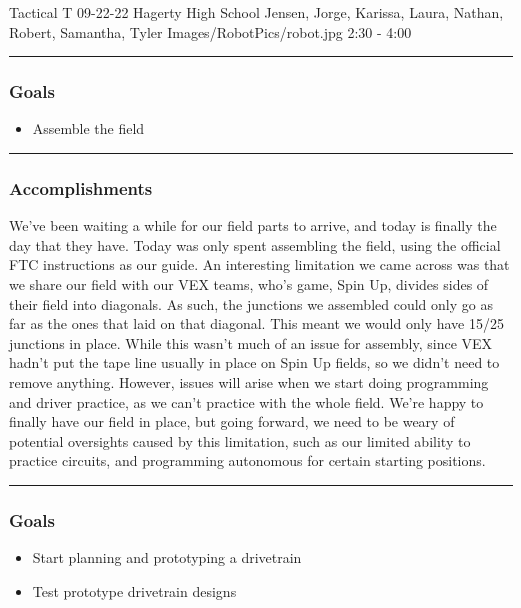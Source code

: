 \insertmeeting 
	{Tactical T} 
	{09-22-22}
	{Hagerty High School}
	{Jensen, Jorge, Karissa, Laura, Nathan, Robert, Samantha, Tyler}
	{Images/RobotPics/robot.jpg}
	{2:30 - 4:00}
	
\noindent\hfil\rule{\textwidth}{.4pt}\hfil
\subsubsection*{Goals}
\begin{itemize}
    \item Assemble the field

\end{itemize} 

\noindent\hfil\rule{\textwidth}{.4pt}\hfil

\subsubsection*{Accomplishments}
We've been waiting a while for our field parts to arrive, and today is finally the day that they have. Today was only spent assembling the field, using the official FTC instructions as our guide. An interesting limitation we came across was that we share our field with our VEX teams, who's game, Spin Up, divides sides of their field into diagonals. As such, the junctions we assembled could only go as far as the ones that laid on that diagonal. This meant we would only have 15/25 junctions in place. While this wasn't much of an issue for assembly, since VEX hadn't put the tape line usually in place on Spin Up fields, so we didn't need to remove anything. However, issues will arise when we start doing programming and driver practice, as we can't practice with the whole field. We're happy to finally have our field in place, but going forward, we need to be weary of potential oversights caused by this limitation, such as our limited ability to practice circuits, and programming autonomous for certain starting positions.

\noindent\hfil\rule{\textwidth}{.4pt}\hfil
\subsubsection*{Goals}
\begin{itemize}
    \item Start planning and prototyping a drivetrain
    \item Test prototype drivetrain designs
    
\end{itemize} 

